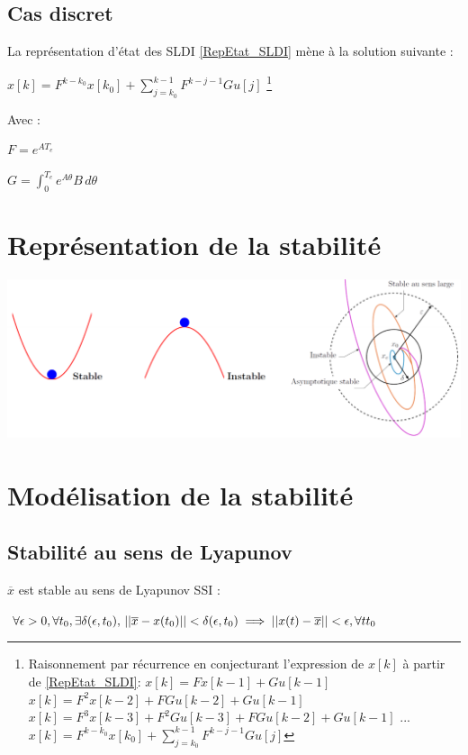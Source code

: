 \subsection{Cas discret}
La représentation d'état des SLDI \eqref{RepEtat_SLDI} mène à la solution suivante : 
\begin{center}
    \Large{$
    x[k] = F^{k-k_{0}}x[k_{0}] + 
    \sum_{j=k_{0}}^{k-1}{F^{k-j-1}Gu[j]}
    $} 
    \footnote{Raisonnement par récurrence en conjecturant l'expression de $x[k]$ à partir de \eqref{RepEtat_SLDI}: \newline
    $x[k] = Fx[k-1] + Gu[k-1]$ \newline
    $x[k] = F^{2}x[k-2] + FGu[k-2] + Gu[k-1]$ \newline
    $x[k] = F^{3}x[k-3] + F^{2}Gu[k-3] +  FGu[k-2] + Gu[k-1]$ \newline
    ... \newline
    $x[k] = F^{k-k_{0}}x[k_{0}] + 
    \sum_{j=k_{0}}^{k-1}{F^{k-j-1}Gu[j]}$
    }
\end{center}
Avec : \newline

\Large{
$F = e^{AT_{e}}$ \newline

$G = \int_{0}^{T_{e}}{ e^{A\theta}B \,d\theta}$
}
\newpage
\section{Représentation de la stabilité}
\begin{center}
    \includegraphics[scale=0.6]{Pics/Stabilite.png}
\end{center}
\section{Modélisation de la stabilité}
\subsection{Stabilité au sens de Lyapunov}
$\overline{x}$ est stable au sens de Lyapunov SSI :
\begin{center}
    \Large{$
    \forall \epsilon > 0, \forall t_{0}, \exists \delta(\epsilon, t_{0}), \newline
    \left\lvert\lvert \overline{x} - x(t_{0}) \right\rvert\rvert < \delta(\epsilon,t_{0}) 
    \implies \left\lvert\lvert x(t) - \overline{x} \right\rvert\rvert < \epsilon, \forall t t_{0}
    $}
\end{center}
